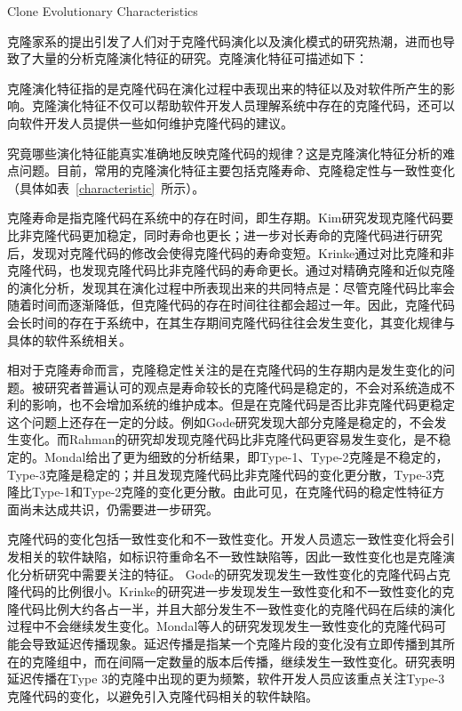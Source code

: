 {Clone Evolutionary Characteristics}

克隆家系的提出引发了人们对于克隆代码演化以及演化模式的研究热潮，进而也导致了大量的分析克隆演化特征的研究。克隆演化特征可描述如下：\\

\begin{definition}[{克隆演化特征}]
\label{defn-characteristics}
克隆演化特征指的是克隆代码在演化过程中表现出来的特征以及对软件所产生的影响。克隆演化特征不仅可以帮助软件开发人员理解系统中存在的克隆代码，还可以向软件开发人员提供一些如何维护克隆代码的建议。
\end {definition}

究竟哪些演化特征能真实准确地反映克隆代码的规律？这是克隆演化特征分析的难点问题。目前，常用的克隆演化特征主要包括克隆寿命、克隆稳定性与一致性变化（具体如表~\ref{characteristic}~所示）。

克隆寿命是指克隆代码在系统中的存在时间，即生存期。Kim研究发现克隆代码要比非克隆代码更加稳定，同时寿命也更长\cite{kim2005empirical}；进一步对长寿命的克隆代码进行研究后，发现对克隆代码的修改会使得克隆代码的寿命变短\cite{cai2011empirical}。Krinke通过对比克隆和非克隆代码，也发现克隆代码比非克隆代码的寿命更长\cite{krinke2011cloned}。通过对精确克隆和近似克隆的演化分析，发现其在演化过程中所表现出来的共同特点是：尽管克隆代码比率会随着时间而逐渐降低，但克隆代码的存在时间往往都会超过一年\cite{bazrafshan2012evolution}。因此，克隆代码会长时间的存在于系统中，在其生存期间克隆代码往往会发生变化，其变化规律与具体的软件系统相关\cite{gode2009evolution}。

相对于克隆寿命而言，克隆稳定性关注的是在克隆代码的生存期内是发生变化的问题。被研究者普遍认可的观点是寿命较长的克隆代码是稳定的\cite{krinke2008cloned}\cite{gode2011clone}\cite{harder2013cloned}，不会对系统造成不利的影响，也不会增加系统的维护成本。但是在克隆代码是否比非克隆代码更稳定这个问题上还存在一定的分歧。例如Gode研究发现大部分克隆是稳定的，不会发生变化\cite{gode2011frequency}。而Rahman的研究却发现克隆代码比非克隆代码更容易发生变化，是不稳定的\cite{rahman2014change}。Mondal给出了更为细致的分析结果，即Type-1、Type-2克隆是不稳定的，Type-3克隆是稳定的；并且发现克隆代码比非克隆代码的变化更分散，Type-3克隆比Type-1和Type-2克隆的变化更分散\cite{mondal2012comparative}\cite{mondal2012dispersion}。由此可见，在克隆代码的稳定性特征方面尚未达成共识，仍需要进一步研究。

克隆代码的变化包括一致性变化和不一致性变化。开发人员遗忘一致性变化将会引发相关的软件缺陷，如标识符重命名不一致性缺陷等，因此一致性变化也是克隆演化分析研究中需要关注的特征。 Gode的研究发现发生一致性变化的克隆代码占克隆代码的比例很小\cite{gode2011frequency}。Krinke的研究进一步发现发生一致性变化和不一致性变化的克隆代码比例大约各占一半，并且大部分发生不一致性变化的克隆代码在后续的演化过程中不会继续发生变化\cite{krinke2007study}。Mondal等人的研究发现发生一致性变化的克隆代码可能会导致延迟传播现象。延迟传播是指某一个克隆片段的变化没有立即传播到其所在的克隆组中，而在间隔一定数量的版本后传播，继续发生一致性变化。研究表明延迟传播在Type 3的克隆中出现的更为频繁，软件开发人员应该重点关注Type-3克隆代码的变化，以避免引入克隆代码相关的软件缺陷\cite{mondal2016comparative}。

